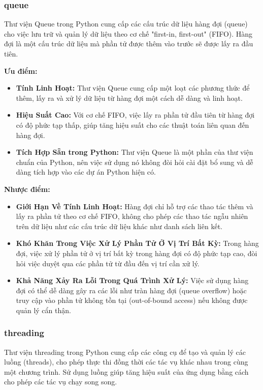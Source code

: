 \documentclass[a4paper]{article}
\begin{document}
\subsubsection{queue}
\begin{par}
    Thư viện Queue trong Python cung cấp các cấu trúc dữ liệu hàng đợi (queue) cho việc lưu trữ và quản lý dữ liệu theo cơ chế "first-in, first-out" (FIFO). Hàng đợi là một cấu trúc dữ liệu mà phần tử được thêm vào trước sẽ được lấy ra đầu tiên.
\end{par}


\textbf{Ưu điểm: }
\begin{itemize}
    \item \textbf{Tính Linh Hoạt:} Thư viện Queue cung cấp một loạt các phương thức để thêm, lấy ra và xử lý dữ liệu từ hàng đợi một cách dễ dàng và linh hoạt.
    
    \item \textbf{Hiệu Suất Cao:} Với cơ chế FIFO, việc lấy ra phần tử đầu tiên từ hàng đợi có độ phức tạp thấp, giúp tăng hiệu suất cho các thuật toán liên quan đến hàng đợi.
    
    \item \textbf{Tích Hợp Sẵn trong Python:} Thư viện Queue là một phần của thư viện chuẩn của Python, nên việc sử dụng nó không đòi hỏi cài đặt bổ sung và dễ dàng tích hợp vào các dự án Python hiện có.
\end{itemize}

\textbf{Nhược điểm: }
\begin{itemize}
    \item \textbf{Giới Hạn Về Tính Linh Hoạt:} Hàng đợi chỉ hỗ trợ các thao tác thêm và lấy ra phần tử theo cơ chế FIFO, không cho phép các thao tác ngẫu nhiên trên dữ liệu như các cấu trúc dữ liệu khác như danh sách liên kết.
    
    \item \textbf{Khó Khăn Trong Việc Xử Lý Phần Tử Ở Vị Trí Bất Kỳ:} Trong hàng đợi, việc xử lý phần tử ở vị trí bất kỳ trong hàng đợi có độ phức tạp cao, đòi hỏi việc duyệt qua các phần tử từ đầu đến vị trí cần xử lý.
    
    \item \textbf{Khả Năng Xảy Ra Lỗi Trong Quá Trình Xử Lý:} Việc sử dụng hàng đợi có thể dễ dàng gây ra các lỗi như tràn hàng đợi (queue overflow) hoặc truy cập vào phần tử không tồn tại (out-of-bound access) nếu không được quản lý cẩn thận.
\end{itemize}

\subsubsection{threading}
\begin{par}
Thư viện threading trong Python cung cấp các công cụ để tạo và quản lý các luồng (threads), cho phép thực thi đồng thời các tác vụ khác nhau trong cùng một chương trình. Sử dụng luồng giúp tăng hiệu suất của ứng dụng bằng cách cho phép các tác vụ chạy song song.     
\end{par}
\end{document}
